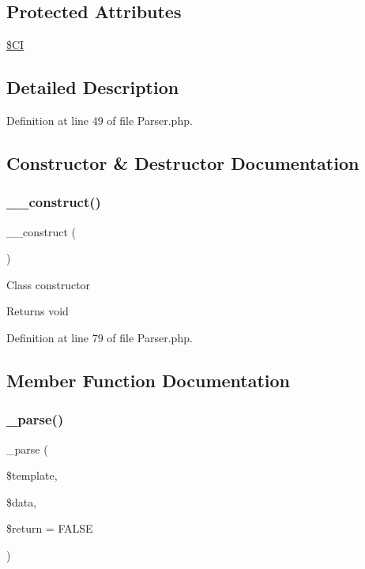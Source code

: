 \subsection*{Protected Attributes}
\begin{DoxyCompactItemize}
\item 
\mbox{\hyperlink{class_c_i___parser_ae0314d046ddf7fcfaec03222977427d3}{\$\+CI}}
\end{DoxyCompactItemize}


\subsection{Detailed Description}


Definition at line 49 of file Parser.\+php.



\subsection{Constructor \& Destructor Documentation}
\mbox{\label{class_c_i___parser_a095c5d389db211932136b53f25f39685}} 
\subsubsection{\texorpdfstring{\_\_construct()}{\_\_construct()}}
{\footnotesize\ttfamily \+\_\+\+\_\+construct (\begin{DoxyParamCaption}{ }\end{DoxyParamCaption})}

Class constructor

\begin{DoxyReturn}{Returns}
void 
\end{DoxyReturn}


Definition at line 79 of file Parser.\+php.



\subsection{Member Function Documentation}
\mbox{\label{class_c_i___parser_a6bd5ad826db82a61de1f3a13031faaf9}} 
\subsubsection{\texorpdfstring{\_parse()}{\_parse()}}
{\footnotesize\ttfamily \+\_\+parse (\begin{DoxyParamCaption}\item[{}]{\$template,  }\item[{}]{\$data,  }\item[{}]{\$return = {\ttfamily FALSE} }\end{DoxyParamCaption})\hspace{0.3cm}{\ttfamily [protected]}}


